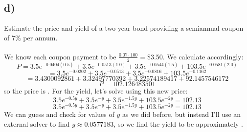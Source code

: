 \documentclass{article}
\begin{document}
{\subsection*{d)}
Estimate the price and yield of a two-year bond providing a semiannual coupon of 7\% per annum. \\ \\
We know each coupon payment to be \(\frac{0.07 \cdot 100}{2} = \)\$3.50. We calculate accordingly:
\[
  P = 3.5e^{-0.0404(0.5)} + 3.5e^{-0.0513(1.0)} + 3.5e^{-0.0544(1.5)} + 103.5e^{-0.0581(2.0)}
\]
\[
  = 3.5e^{-0.0202} + 3.5e^{-0.0513} + 3.5e^{-0.0816} + 103.5e^{-0.1162}
\]
\[
  = 3.4300092861 + 3.32497770392 + 3.22574189417 + 92.1457546172
\]
\[
  P = 102.126483501
\]
so the price is . For the yield, let's solve using this new price:
\[
  3.5e^{-0.5y} + 3.5e^{-y} + 3.5e^{-1.5y} + 103.5e^{-2y} = 102.13
\]
\[
  3.5e^{-0.5y} + 3.5e^{-y} + 3.5e^{-1.5y} + 103.5e^{-2y} = 102.13
\]
We can guess and check for values of \(y\) as we did before, but instead I'll use an external solver to find \(y \approx 0.0577183\), so we find the yield to be approximately .

}
\end{document}
